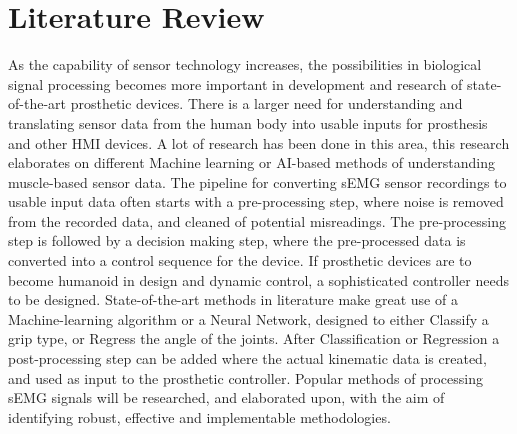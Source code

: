 \documentclass[../main.tex]{subfiles}
\begin{document}
\section{Literature Review}
\label{sec:literature}

As the capability of sensor technology increases, the possibilities in biological signal processing becomes more important in development and research of state-of-the-art prosthetic devices.
There is a larger need for understanding and translating sensor data from the human body into usable inputs for prosthesis and other \gls{HMI} devices.
A lot of research has been done in this area, this research elaborates on different Machine learning or AI-based methods of understanding muscle-based sensor data.
The pipeline for converting sEMG sensor recordings to usable input data often starts with a pre-processing step, where noise is removed from the recorded data, and cleaned of potential misreadings.
The pre-processing step is followed by a decision making step, where the pre-processed data is converted into a control sequence for the device.
If prosthetic devices are to become humanoid in design and dynamic control, a sophisticated controller needs to be designed.
State-of-the-art methods in literature make great use of a Machine-learning algorithm or a Neural Network, designed to either Classify a grip type, or Regress the angle of the joints.
After Classification or Regression a post-processing step can be added where the actual kinematic data is created, and used as input to the prosthetic controller. 
Popular methods of processing sEMG signals will be researched, and elaborated upon, with the aim of identifying robust, effective and implementable methodologies.

\end{document}
